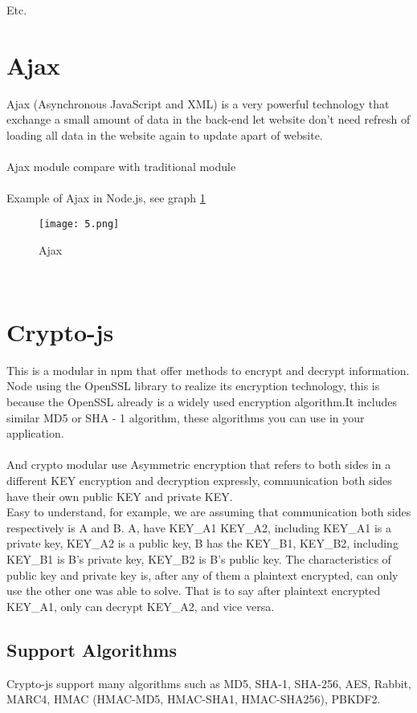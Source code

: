{Etc.



\section{Ajax}\cite{12}
Ajax (Asynchronous JavaScript and XML) is a very powerful technology that exchange a small amount of data in the back-end let website don’t need refresh of loading all data in the website again to update apart of website.\\
\\
Ajax module compare with traditional module\\
\\
Example of Ajax in Node.js, see graph \ref{fig:17 cubed graph}
\begin{figure}[h]
	\centering
	\texttt{[image: 5.png]}
	\caption{Ajax}
	\label{fig:17 cubed graph}
\end{figure}
\\
\section{Crypto-js}	
This is a modular in npm that offer methods to encrypt and decrypt information.
Node using the OpenSSL library to realize its encryption technology, this is because the OpenSSL already is a widely used encryption algorithm.It includes similar MD5 or SHA - 1 algorithm, these algorithms you can use in your application.\\
\\
And crypto modular use Asymmetric encryption that refers to both sides in a different KEY encryption and decryption expressly, communication both sides have their own public KEY and private KEY.\\ 
Easy to understand, for example, we are assuming that communication both sides respectively is A and B. A, have KEY\_A1 KEY\_A2, including KEY\_A1 is a private key, KEY\_A2 is a public key, B has the KEY\_B1, KEY\_B2, including KEY\_B1 is B's private key, KEY\_B2 is B's public key. The characteristics of public key and private key is, after any of them a plaintext encrypted, can only use the other one was able to solve. That is to say after plaintext encrypted KEY\_A1, only can decrypt KEY\_A2, and vice versa.
\\
\subsection{Support Algorithms}
Crypto-js support many algorithms such as MD5, SHA-1, SHA-256, AES, Rabbit, MARC4, HMAC (HMAC-MD5, HMAC-SHA1, HMAC-SHA256), PBKDF2.
\\
}
